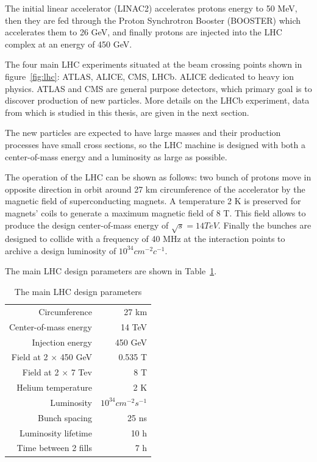 The initial linear accelerator (LINAC2) accelerates protons energy to 50 MeV,
then they are fed through the Proton Synchrotron Booster (BOOSTER) which
accelerates them to 26 GeV, and finally protons are injected  into the LHC
complex at an energy of 450 GeV.

The four main LHC experiments situated at the beam crossing points shown in
figure~\ref{fig:lhc}: ATLAS, ALICE, CMS, LHCb. ALICE dedicated to heavy ion physics.
ATLAS and CMS are general purpose detectors, which primary goal is to discover
production of new particles. More details on the  LHCb experiment, data from
 which is studied in this thesis, are given in the next section.

The new particles are expected to have large masses and their production
processes have small cross sections, so the LHC machine is designed with both
a center-of-mass energy and a luminosity as large as possible.

The operation of the LHC can be shown as follows: two bunch of protons move in
opposite direction in orbit around 27 km circumference of the accelerator by
the magnetic field of superconducting magnets. A temperature 2 K is preserved
for magnets' coils to generate a maximum magnetic field of 8 T.  This field
allows to produce the design center-of-mass energy of $\sqrt{s}=14 TeV$.
Finally the bunches are designed to collide with a frequency of 40 MHz at the
interaction points to archive a design luminosity of $10^{34}cm^{-2}c^{-1}$.

The main LHC design parameters are shown in Table~\ref{tab:lhc}.

\begin{table}[t]
    \label{tab:lhc}
    \caption{\small The main LHC design parameters}
    \centering
    \begin{tabular}{r|r}
        Circumference  &  27 km\\
        Center-of-mass energy &  14 TeV\\
        Injection energy  &  450 GeV\\
        Field at 2 $\times$ 450 GeV  &  0.535 T\\
        Field at 2 $\times$ 7 Tev & 8 T\\
        Helium temperature & 2 K\\
        Luminosity & $10^{34}cm^{-2}s^{-1}$\\
        Bunch spacing  & 25 ns\\
        Luminosity lifetime & 10 h\\
        Time between 2 fills  &  7 h\\
    \end{tabular}
\end{table}


